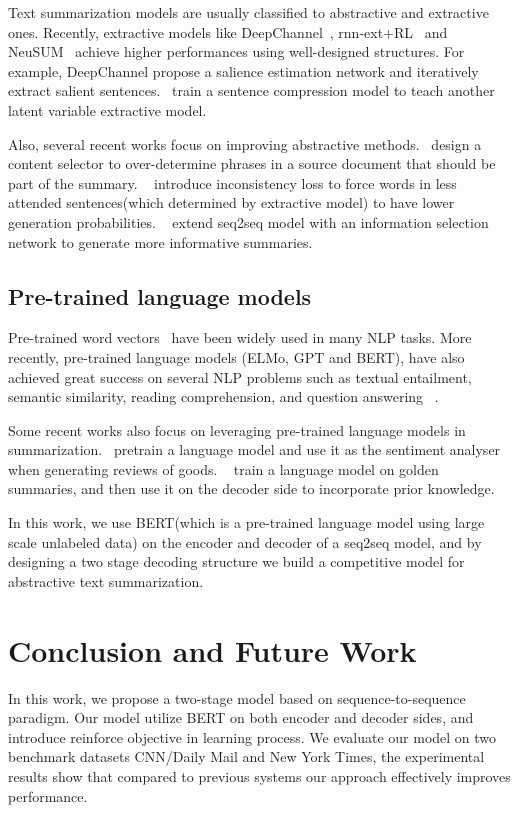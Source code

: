 \documentclass{article}
\begin{document}
Text summarization models are usually classified to abstractive and extractive ones.
Recently, extractive models like DeepChannel~\cite{Shi2018}, rnn-ext+RL~\cite{chen2018fast} and NeuSUM~\cite{DBLP:conf/acl/ZhaoZWYHZ18} achieve higher performances using well-designed structures. For example, DeepChannel propose a salience estimation network and iteratively extract salient sentences.~\cite{zhang2018neural} train a sentence compression model to teach another latent variable extractive model.

Also, several recent works focus on improving abstractive methods.~\cite{gehrmann2018bottom} design a content selector to over-determine phrases in a source document that should be part of the summary. ~\cite{hsu2018unified} introduce inconsistency loss to force words in less attended sentences(which determined by extractive model) to have lower generation probabilities.
~\cite{Li2018} extend seq2seq model with an information selection network to generate more informative summaries. 

\subsection{Pre-trained language models}

Pre-trained word vectors~\cite{mikolov2013distributed,pennington2014glove,bojanowski2017enriching} have been widely used in many NLP tasks. More recently, pre-trained language models (ELMo, GPT and BERT), have also achieved great success on several NLP problems such as textual entailment, semantic similarity, reading comprehension, and question answering ~\cite{peters2018deep,radford2018improving,devlin2018bert}. 

Some recent works also focus on leveraging pre-trained language models in summarization.~\cite{Radford2017} pretrain a language model and use it as the sentiment analyser when generating reviews of goods.
~\cite{kryscinski2018improving} train a language model on golden summaries, and then use it on the decoder side to incorporate prior knowledge. 

In this work, we use BERT(which is a pre-trained language model using large scale unlabeled data) on the encoder and decoder of a seq2seq model, and by designing a two stage decoding structure we build a competitive model for abstractive text summarization.

\section{Conclusion and Future Work}
In this work, we propose a two-stage model based on sequence-to-sequence paradigm. Our model utilize BERT on both encoder and decoder sides, and introduce reinforce objective in learning process. We evaluate our model on two benchmark datasets CNN/Daily Mail and New York Times, the experimental results show that compared to previous systems our approach effectively improves performance. 
\end{document}

